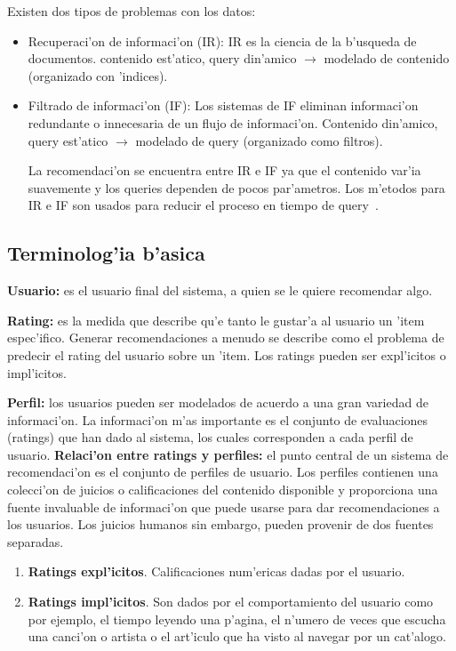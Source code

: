 \documentclass[11pt]{article}
\begin{document}
Existen dos tipos de problemas con los datos:
\begin{itemize}
\item Recuperaci'on de informaci'on (IR): IR es la ciencia de la b'usqueda de documentos. contenido est'atico, query din'amico $\rightarrow$ modelado de contenido (organizado con 'indices).
\item Filtrado de informaci'on (IF): Los sistemas de IF eliminan informaci'on redundante o innecesaria de un flujo de informaci'on. Contenido din'amico, query est'atico $\rightarrow$ modelado de query (organizado como filtros).

La recomendaci'on se encuentra entre IR e IF ya que el contenido var'ia suavemente y los queries dependen de pocos par'ametros. Los m'etodos para IR e IF son usados para reducir el proceso en tiempo de query~\cite{recsys:alban}.
\end{itemize}

\subsection{Terminolog'ia b'asica}

\smallskip
\textbf{Usuario:} es el usuario final del sistema, a quien se le quiere recomendar algo.

\smallskip
\textbf{Rating:} es la medida que describe qu'e tanto le gustar'a al usuario un 'item espec'ifico. Generar recomendaciones a menudo se describe como el problema de predecir el rating del usuario sobre un 'item. Los ratings pueden ser expl'icitos o impl'icitos.

\smallskip
\textbf{Perfil:} los usuarios pueden ser modelados de acuerdo a una gran variedad de informaci'on. La informaci'on m'as importante es el conjunto de evaluaciones (ratings) que han dado al sistema, los cuales corresponden a cada perfil de usuario.
\smallskip
\textbf{Relaci'on entre ratings y perfiles:} el punto central de un sistema de recomendaci'on es el conjunto de perfiles de usuario. Los perfiles contienen una colecci'on de juicios o calificaciones del contenido disponible y proporciona una fuente invaluable de informaci'on que puede usarse para dar recomendaciones a los usuarios. Los juicios humanos sin embargo, pueden provenir de dos fuentes separadas.
\begin{enumerate}
\item \textbf{Ratings expl'icitos}. Calificaciones num'ericas dadas por el usuario.
\item \textbf{Ratings impl'icitos}. Son dados por el comportamiento del usuario como por ejemplo, el tiempo leyendo una p'agina, el n'umero de veces que escucha una canci'on o artista o el art'iculo que ha visto al navegar por un cat'alogo.
\end{enumerate}
\end{document}
